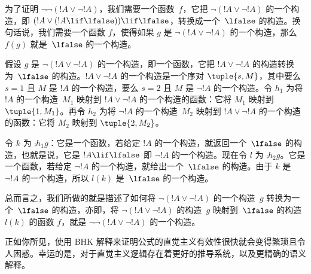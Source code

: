\documentclass[../../../include/open-logic-section]{subfiles}
\begin{document}
\begin{ex}
为了证明 $\lnot \lnot (!A \lor \lnot !A)$，我们需要一个函数~$f$，它把 $\lnot(!A \lor \lnot !A)$ 的一个构造，即 $(!A
\lor (!A \lif \lfalse)) \lif \lfalse$，转换成一个~$\lfalse$ 的构造。换句话说，我们需要一个函数 $f$，使得如果 $g$ 是 $\lnot(!A \lor \lnot !A)$ 的一个构造，那么 $f(g)$ 就是~$\lfalse$ 的一个构造。

假设 $g$ 是 $\lnot(!A \lor \lnot !A)$ 的一个构造，即一个函数，它把 $!A \lor \lnot !A$ 的构造转换为~$\lfalse$ 的构造。$!A \lor \lnot !A$ 的一个构造是一个序对 $\tuple{s, M}$，其中要么 $s = 1$ 且 $M$ 是 $!A$ 的一个构造，要么 $s = 2$ 且 $M$ 是 $\lnot !A$ 的一个构造。令 $h_1$ 为将 $!A$ 的一个构造~$M_1$ 映射到 $!A \lor \lnot !A$ 的一个构造的函数：它将 $M_1$ 映射到 $\tuple{1, M_1}$。再令 $h_2$ 为将 $\lnot !A$ 的一个构造~$M_2$ 映射到 $!A \lor \lnot !A$ 的一个构造的函数：它将 $M_2$ 映射到 $\tuple{2, M_2}$。

令 $k$ 为 $\comp{h_1}{g}$：它是一个函数，若给定 $!A$ 的一个构造，就返回一个~$\lfalse$ 的构造，也就是说，它是 $!A \lif \lfalse$ 即 $\lnot !A$ 的一个构造。现在令 $l$ 为 $\comp{h_2}{g}$。它是一个函数，若给定 $\lnot !A$ 的一个构造，就给出一个~$\lfalse$ 的构造。由于 $k$ 是 $\lnot !A$ 的一个构造，所以 $l(k)$ 是~$\lfalse$ 的一个构造。

总而言之，我们所做的就是描述了如何将 $\lnot(!A \lor \lnot !A)$ 的一个构造~$g$ 转换为一个~$\lfalse$ 的构造，亦即，将 $\lnot(!A \lor \lnot !A)$ 的构造~$g$ 映射到~$\lfalse$ 的构造 $l(k)$ 的函数 $f$，就是 $\lnot\lnot(!A \lor \lnot !A)$ 的一个构造。
\end{ex}

正如你所见，使用 BHK 解释来证明公式的直觉主义有效性很快就会变得繁琐且令人困惑。幸运的是，对于直觉主义逻辑存在着更好的推导系统，以及更精确的语义解释。
\end{document}

